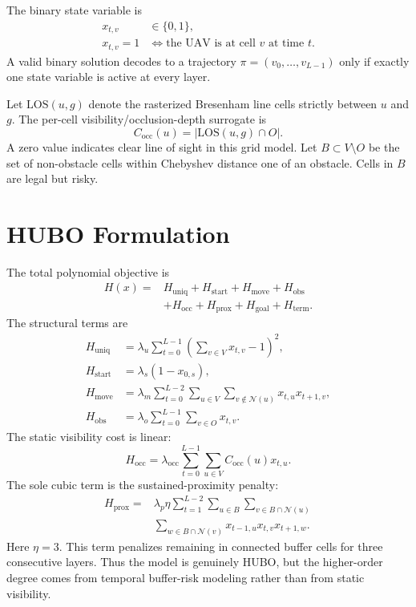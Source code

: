 \documentclass[letterpaper]{article} %
\begin{document}
The binary state variable is
\begin{equation}
\begin{aligned}
x_{t,v}&\in\{0,1\},\\
x_{t,v}=1&\Leftrightarrow \text{the UAV is at cell }v\text{ at time }t.
\end{aligned}
\end{equation}
A valid binary solution decodes to a trajectory $\pi=(v_0,\ldots,v_{L-1})$ only if exactly one state variable is active at every layer.

Let $\mathrm{LOS}(u,g)$ denote the rasterized Bresenham line cells strictly between $u$ and $g$. The per-cell visibility/occlusion-depth surrogate is
\begin{equation}
 C_{\mathrm{occ}}(u)=|\mathrm{LOS}(u,g)\cap O|.
\end{equation}
A zero value indicates clear line of sight in this grid model. Let $B\subset V\setminus O$ be the set of non-obstacle cells within Chebyshev distance one of an obstacle. Cells in $B$ are legal but risky.

\section{HUBO Formulation}
The total polynomial objective is
\begin{equation}
\begin{split}
H(x) = &H_{\mathrm{uniq}} + H_{\mathrm{start}} + H_{\mathrm{move}} + H_{\mathrm{obs}} \\
&+ H_{\mathrm{occ}} + H_{\mathrm{prox}} + H_{\mathrm{goal}} + H_{\mathrm{term}} .
\end{split}
\end{equation}
The structural terms are
\begin{align}
H_{\mathrm{uniq}} &= \lambda_u \sum_{t=0}^{L-1}\left(\sum_{v\in V} x_{t,v}-1\right)^2,\\
H_{\mathrm{start}} &= \lambda_s(1-x_{0,s}),\\
H_{\mathrm{move}} &= \lambda_m\sum_{t=0}^{L-2}\sum_{u\in V}\sum_{v\notin\mathcal{N}(u)}x_{t,u}x_{t+1,v},\\
H_{\mathrm{obs}} &= \lambda_o\sum_{t=0}^{L-1}\sum_{v\in O}x_{t,v}.
\end{align}
The static visibility cost is linear:
\begin{equation}
H_{\mathrm{occ}}=\lambda_{\mathrm{occ}}\sum_{t=0}^{L-1}\sum_{u\in V}C_{\mathrm{occ}}(u)x_{t,u}.
\end{equation}
The sole cubic term is the sustained-proximity penalty:
\begin{equation}
\begin{aligned}
H_{\mathrm{prox}}={}&\lambda_p \eta \sum_{t=1}^{L-2}\sum_{u\in B}
\sum_{v\in B\cap\mathcal{N}(u)}\\
&\sum_{w\in B\cap\mathcal{N}(v)}x_{t-1,u}x_{t,v}x_{t+1,w}.
\end{aligned}
\end{equation}
Here $\eta=3$. This term penalizes remaining in connected buffer cells for three consecutive layers. Thus the model is genuinely HUBO, but the higher-order degree comes from temporal buffer-risk modeling rather than from static visibility.
\end{document}
